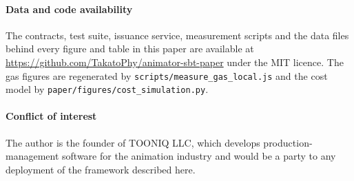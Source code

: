 \documentclass{ledger}
\begin{document}
\paragraph*{Data and code availability}
The contracts, test suite, issuance service, measurement scripts and the data
files behind every figure and table in this paper are available at
\url{https://github.com/TakatoPhy/animator-sbt-paper} under the MIT licence. The
gas figures are regenerated by \texttt{scripts/measure\_gas\_local.js} and the cost
model by \texttt{paper/figures/cost\_simulation.py}.

\paragraph*{Conflict of interest}
The author is the founder of TOONIQ LLC, which develops production-management
software for the animation industry and would be a party to any deployment of the
framework described here.



\end{document}

